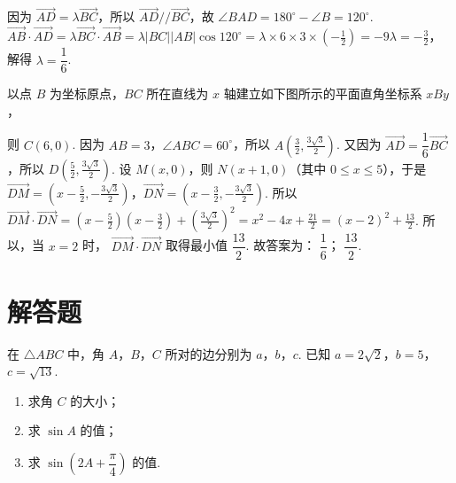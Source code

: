 \begin{solution}
因为 \( \overrightarrow{AD}=\lambda\overrightarrow{BC} \)，所以 \( \overrightarrow{AD}//\overrightarrow{BC} \)，故 \( \angle BAD=180^\circ-\angle B=120^\circ \).
\(\overrightarrow{AB}\cdot\overrightarrow{AD}
=\lambda\overrightarrow{BC}\cdot\overrightarrow{AB}
=\lambda|BC||AB|\cos120^\circ
=\lambda\times6\times3\times\left( -\frac12 \right)
=-9\lambda
=-\frac32\)，
解得 \( \lambda=\dfrac16 \).

以点 \(B\) 为坐标原点，\(BC\) 所在直线为 \( x \) 轴建立如下图所示的平面直角坐标系 \( xBy \)，


则 \( C(6,0) \).
因为 \( AB=3 \)，\( \angle ABC=60^\circ \)，所以
\(A\left( \frac32,\frac{3\sqrt3}{2} \right)\).
又因为 \( \overrightarrow{AD}=\dfrac16\overrightarrow{BC} \)，所以
\(D\left( \frac52,\frac{3\sqrt3}{2} \right)\).
设 \( M(x,0) \)，则 \( N(x+1,0) \)（其中 \( 0\le x\le5 \)），于是
\(\overrightarrow{DM}=\left( x-\frac52,-\frac{3\sqrt3}{2} \right)\)，\(\overrightarrow{DN}=\left( x-\frac32,-\frac{3\sqrt3}{2} \right)\).
所以
\(\overrightarrow{DM}\cdot\overrightarrow{DN}
=\left( x-\frac52 \right)\left( x-\frac32 \right)+\left( \frac{3\sqrt3}{2} \right)^2
=x^2-4x+\frac{21}{2}
=\left( x-2 \right)^2+\frac{13}{2}\).
所以，当 \( x=2 \) 时， \( \overrightarrow{DM}\cdot\overrightarrow{DN} \) 取得最小值 \( \dfrac{13}{2} \).
故答案为： \( \dfrac16 \)； \( \dfrac{13}{2} \).
\end{solution}
\section{解答题}

\begin{problem}
在 \(\triangle ABC\) 中，角 \(A\)，\(B\)，\(C\) 所对的边分别为 \(a\)，\(b\)，\(c\). 已知 \(a=2\sqrt2\)，\(b=5\)，\(c=\sqrt{13}\).

\begin{enumerate}
\item 求角 \(C\) 的大小；
\item 求 \(\sin A\) 的值；
\item 求 \(\sin\left( 2A+\dfrac{\pi}{4} \right)\) 的值.
\end{enumerate}
\end{problem}

